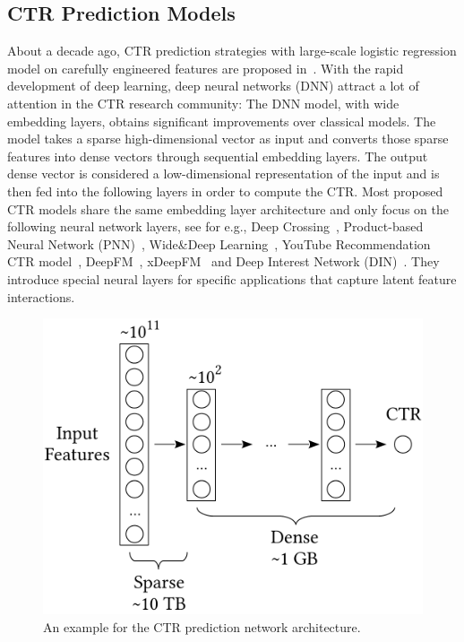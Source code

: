 \documentclass[conference]{IEEEtran}
\begin{document}
\subsection{CTR Prediction Models}
About a decade ago, CTR prediction strategies with large-scale logistic regression model on carefully engineered features are proposed in~\cite{edelman2007internet,graepel2010web}. With the rapid development of deep learning, deep neural networks (DNN) attract a lot of attention in the CTR research community: The DNN model, with wide embedding layers, obtains significant improvements over classical models. The model takes a sparse high-dimensional vector as input and converts those sparse features into dense vectors through sequential embedding layers. The output dense vector is considered a low-dimensional representation of the input and is then fed into the following layers in order to compute the CTR. Most proposed CTR models share the same embedding layer architecture and only focus on the following neural network layers, see for e.g., Deep Crossing~\cite{shan2016deep}, Product-based Neural Network (PNN)~\cite{qu2016product}, Wide\&Deep Learning~\cite{cheng2016wide}, YouTube Recommendation CTR model~\cite{covington2016deep}, DeepFM~\cite{guo2017deepfm}, xDeepFM~\cite{lian2018xdeepfm} and Deep Interest Network (DIN)~\cite{zhou2018deep}. They introduce special neural layers for specific applications that capture latent feature interactions. 

\begin{figure}[htbp]
\vspace{-0.1in}

\centering
\includegraphics[width=.35\textwidth]{figs/ctr2}
\vspace{-0.1in}

\caption{An example for the CTR prediction network architecture.}
\label{fig:ctr}\vspace{-0.05in}
\end{figure}
\end{document}
